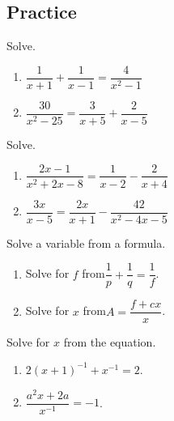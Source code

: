 \subsection{Practice}

\begin{exercise}

Solve.

\begin{enumerate}
\item
  \(\dfrac1{x+1}+\dfrac1{x-1}=\dfrac4{x^2-1}\)
\item
  \(\dfrac{30}{x^2-25}=\dfrac3{x+5}+\dfrac2{x-5}\)
\end{enumerate}

\end{exercise}

\begin{exercise}

Solve.

\begin{enumerate}
\item
  \(\dfrac{2x-1}{x^2+2x-8}=\dfrac1{x-2}-\dfrac{2}{x+4}\)
\item
  \(\dfrac{3x}{x-5}=\dfrac{2x}{x+1}-\dfrac{42}{x^2-4x-5}\)
\end{enumerate}

\end{exercise}

\begin{exercise}

Solve a variable from a formula.

\begin{enumerate}
\item
  Solve for \(f\) from\quad \(\dfrac1p+\dfrac1q=\dfrac1f\).
\item
  Solve for \(x\) from\quad \(A=\dfrac{f+cx}{x}\).
\end{enumerate}

\end{exercise}

\begin{exercise}

Solve for \(x\) from the equation.

\begin{enumerate}
\item
  \(2(x+1)^{-1}+x^{-1}=2\).
\item
  \(\dfrac{a^2x +2a}{x^{-1}}=-1\).
\end{enumerate}

\end{exercise}

